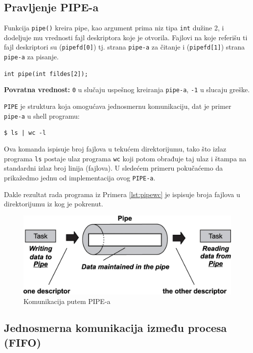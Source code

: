 \documentclass[a4paper, 11pt, twoside]{article}
\newcommand{\scode}[3] {
	\hspace{.06\textwidth} 
	\begin{minipage}[t]{.88\textwidth} %
		\begin{mdframed}[topline=true,bottomline=true,leftline=true,rightline=true,backgroundcolor=gray!22, linecolor=gray!60!black,roundcorner=1mm]
			 

	\begin{center}
		\caption{\textbf{Primer \ref{lst:#3}:} #2}
	\end{center}
	\end{mdframed}
	\end{minipage}

}
\begin{document}
\newpage
\subsection{Pravljenje PIPE-a}
Funkcija \texttt{pipe()} kreira pipe, kao argument prima niz tipa \texttt{int} dužine 2, i dodeljuje mu vrednosti fajl deskriptora koje je otvorila. Fajlovi na koje referišu ti fajl deskriptori su (\texttt{pipefd[0]}) tj. strana \texttt{pipe-a} za čitanje i (\texttt{pipefd[1]}) strana \texttt{pipe-a} za pisanje.  
\begin{center}
	\texttt{int pipe(int fildes[2]);}
\end{center}

\textbf{Povratna vrednost:} \texttt{0} u slučaju uspešnog kreiranja \texttt{pipe-a}, \texttt{-1} u slucaju greške.

\texttt{PIPE} je struktura koja omogućava jednosmernu komunikaciju, dat je primer \texttt{pipe-a} u shell programu: 

\begin{center}
	\texttt{\$ ls | wc -l}  
\end{center}

Ova komanda ispisuje broj fajlova u tekućem direktorijumu, tako što izlaz programa \texttt{ls} postaje ulaz programa \texttt{wc} koji potom obrađuje taj ulaz i štampa na standardni izlaz broj linija (fajlova).
U sledećem primeru pokučaćemo da prikažedmo jednu od implementacija ovog \texttt{PIPE-a}.

\scode{pipe.c}{Pipe (ls | wc -l) izmedju roditelja i deteta}{pipewc}
\vspace{3mm} 

Dakle rezultat rada programa iz Primera \ref{lst:pipewc} je ispisuje broja fajlova u direktorijumu iz kog je pokrenut.
\newpage

\begin{figure}[h]
	\centering
	\vspace{3mm} 
	\includegraphics[width=.65\textwidth]{pipe.jpg} %
	\caption{Komunikacija putem PIPE-a}
	\label{fig:lpipe}
\end{figure}

\subsection{Jednosmerna komunikacija između procesa (FIFO)}
\end{document}
